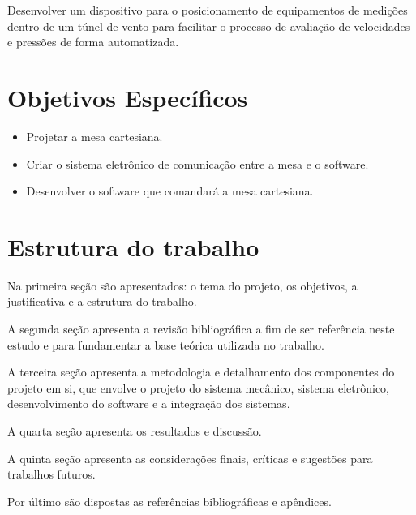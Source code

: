 Desenvolver um dispositivo para o posicionamento de equipamentos de medições dentro de um túnel de vento para 
facilitar o processo de avaliação de velocidades e pressões de forma automatizada.

\section{Objetivos Específicos}\label{sec:objetivoesp}

	\begin{itemize}
		\item Projetar a mesa cartesiana.
		\item Criar o sistema eletrônico de comunicação entre a mesa e o software.
		\item Desenvolver o software que comandará a mesa cartesiana.
	\end{itemize}

\section{Estrutura do trabalho}\label{sec:estruturatrab}

Na primeira seção são apresentados: o tema do projeto, os objetivos, 
a justificativa e a estrutura do trabalho.

A segunda seção apresenta a revisão bibliográfica a fim de ser referência neste estudo e para fundamentar 
a base teórica utilizada no trabalho.

A terceira seção apresenta a metodologia e detalhamento dos componentes do projeto em si, 
que envolve o projeto do sistema mecânico, sistema eletrônico, desenvolvimento do software 
e a integração dos sistemas.

A quarta seção apresenta os resultados e discussão.

A quinta seção apresenta as considerações finais, críticas e sugestões para trabalhos futuros.

Por último são dispostas as referências bibliográficas e apêndices.